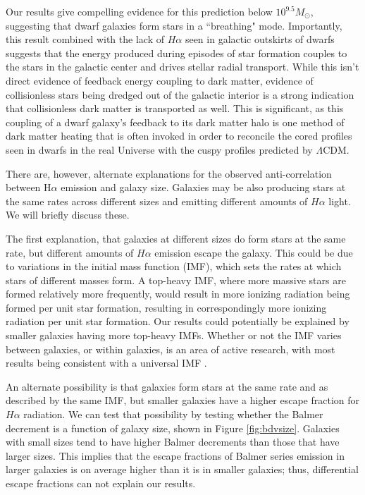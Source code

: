 \documentclass[iop]{emulateapj}
\begin{document}
Our results give compelling evidence for this prediction below $10^{9.5} M_{\odot}$, suggesting that dwarf galaxies form stars in a ``breathing" mode. Importantly, this result combined with the lack of $H\alpha$ seen in galactic outskirts of dwarfs suggests that the energy produced during episodes of star formation couples to the stars in the galactic center and drives stellar radial transport. While this isn't direct evidence of feedback energy coupling to dark matter, evidence of collisionless stars being dredged out of the galactic interior is a strong indication that collisionless dark matter is transported as well. This is significant, as this coupling of a dwarf galaxy's feedback to its dark matter halo is one method of dark matter heating that is often invoked in order to reconcile the cored profiles seen in dwarfs in the real Universe with the cuspy profiles predicted by $\Lambda$CDM. 

There are, however, alternate explanations for the observed anti-correlation between H$\alpha$ emission and galaxy size. Galaxies may be also producing stars at the same rates across different sizes and emitting different amounts of $H\alpha$ light. We will briefly discuss these.

The first explanation, that galaxies at different sizes do form stars at the same rate, but different amounts of $H\alpha$ emission escape the galaxy. This could be due to variations in the initial mass function (IMF), which sets the rates at which stars of different masses form. A top-heavy IMF, where more massive stars are formed relatively more frequently, would result in more ionizing radiation being formed per unit star formation, resulting in correspondingly more ionizing radiation per unit star formation. Our results could potentially be explained by smaller galaxies having more top-heavy IMFs. Whether or not the IMF varies between galaxies, or within galaxies, is an area of active research, with most results being consistent with a universal IMF \citep[e.g.,][]{Bastian10}. 

An alternate possibility is that galaxies form stars at the same rate and as described by the same IMF, but smaller galaxies have a higher escape fraction for $H\alpha$ radiation. We can test that possibility by testing whether the Balmer decrement is a function of galaxy size, shown in Figure \ref{fig:bdvsize}. Galaxies with small sizes tend to have higher Balmer decrements than those that have larger sizes. This implies that the escape fractions of Balmer series emission in larger galaxies is on average higher than it is in smaller galaxies; thus, differential escape fractions can not explain our results.
\end{document}
